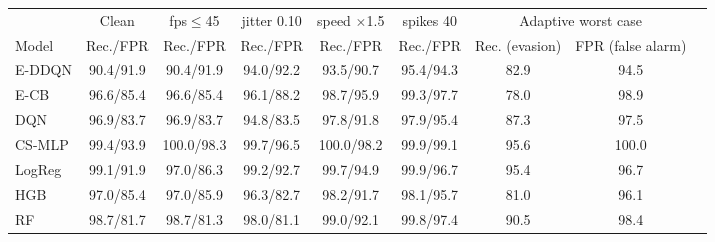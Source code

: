 \begin{tabular}{lcccccccc}
\toprule
 & Clean & fps$\le$45 & jitter 0.10 & speed $\times$1.5 & spikes 40 & \multicolumn{2}{c}{Adaptive worst case} \\
Model & Rec./FPR & Rec./FPR & Rec./FPR & Rec./FPR & Rec./FPR & Rec. (evasion) & FPR (false alarm) \\
\midrule
E-DDQN & 90.4/91.9 & 90.4/91.9 & 94.0/92.2 & 93.5/90.7 & 95.4/94.3 & 82.9 & 94.5 \\
E-CB & 96.6/85.4 & 96.6/85.4 & 96.1/88.2 & 98.7/95.9 & 99.3/97.7 & 78.0 & 98.9 \\
DQN & 96.9/83.7 & 96.9/83.7 & 94.8/83.5 & 97.8/91.8 & 97.9/95.4 & 87.3 & 97.5 \\
CS-MLP & 99.4/93.9 & 100.0/98.3 & 99.7/96.5 & 100.0/98.2 & 99.9/99.1 & 95.6 & 100.0 \\
LogReg & 99.1/91.9 & 97.0/86.3 & 99.2/92.7 & 99.7/94.9 & 99.9/96.7 & 95.4 & 96.7 \\
HGB & 97.0/85.4 & 97.0/85.9 & 96.3/82.7 & 98.2/91.7 & 98.1/95.7 & 81.0 & 96.1 \\
RF & 98.7/81.7 & 98.7/81.3 & 98.0/81.1 & 99.0/92.1 & 99.8/97.4 & 90.5 & 98.4 \\
\bottomrule
\end{tabular}
